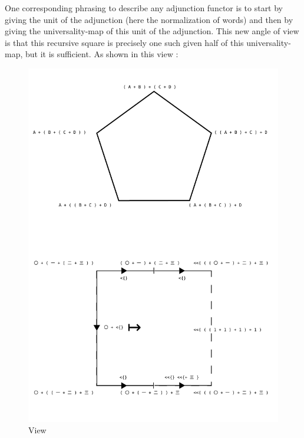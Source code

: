 \documentclass[runningheads,a4paper]{llncs}
\begin{document}
One corresponding phrasing to describe any adjunction functor is to
start by giving the unit of the adjunction (here the normalization of
words) and then by giving the universality-map of this unit of the
adjunction. This new angle of view is that this recursive square is
precisely one such given half of this universality-map, but it is
sufficient.  As shown in this view :

\begin{figure}\centering \includegraphics[scale=0.5]{maclaneSolution.svg.pdf} \caption{View}\end{figure}
\end{document}

